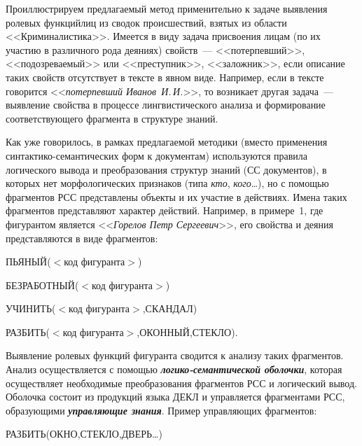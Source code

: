 \begin{multicols}{2}
     Проиллюстрируем предлагаемый метод применительно к задаче 
выявления ролевых функций\linebreak лиц из сводок происшествий, взятых из области 
<<Криминалистика>>. Имеется в виду задача присвоения лицам (по их участию 
в различного рода деяниях) свойств~--- <<потерпевший>>, <<подозреваемый>> 
или <<преступник>>, <<заложник>>, если описание таких %
свойств отсутствует 
в тексте в явном виде. На\-пример, если в тексте говорится 
<<\textit{потерпевший %
Иванов~И.\,И.}>>, то возникает другая задача~--- 
выявление свойства в процессе лингвистического анализа и формирование 
соответствующего фрагмента в структуре знаний. 
     
     Как уже говорилось, в рамках пред\-ла\-га\-емой методики (вместо 
применения синтактико-се\-ман\-ти\-че\-ских форм к документам) используются 
правила логического вывода и преобразования структур знаний (СС 
документов), в которых нет морфологических признаков (типа \textit{кто}, 
\textit{кого}\ldots), но с помощью фрагментов РСС представлены объекты и их 
участие в действиях. Имена таких фрагментов представляют характер действий. 
Например, в примере~1, где фигурантом является <<\textit{Горелов Петр 
Сергеевич}>>, его свойства и деяния представляются в виде фрагментов:

\smallskip
     
{\small
\noindent
     ПЬЯНЫЙ($<$код фигуранта$>$)
     
\noindent
     БЕЗРАБОТНЫЙ($<$код фигуранта$>$)
     
\noindent
     УЧИНИТЬ($<$код фигуранта$>$,СКАНДАЛ)
     
\noindent
     РАЗБИТЬ($<$код фигуранта$>$,ОКОННЫЙ,СТЕКЛО). 
     }
     
     \smallskip
     
     Выявление ролевых функций фигуранта сводится к анализу таких 
фрагментов. Анализ осуществляется с помощью 
     {\bfseries\textit{логико-семантической оболочки}}, которая осуществляет 
необходимые преобразования фрагментов РСС и логический вывод. Оболочка 
состоит из продукций языка ДЕКЛ и управляется фрагментами РСС, 
образующими {\bfseries\textit{управляющие знания}}. Пример управляющих 
фрагментов: 

\smallskip
     
{\small 

\noindent
РАЗБИТЬ(ОКНО,СТЕКЛО,ДВЕРЬ\ldots)
     
}
\end{multicols}
